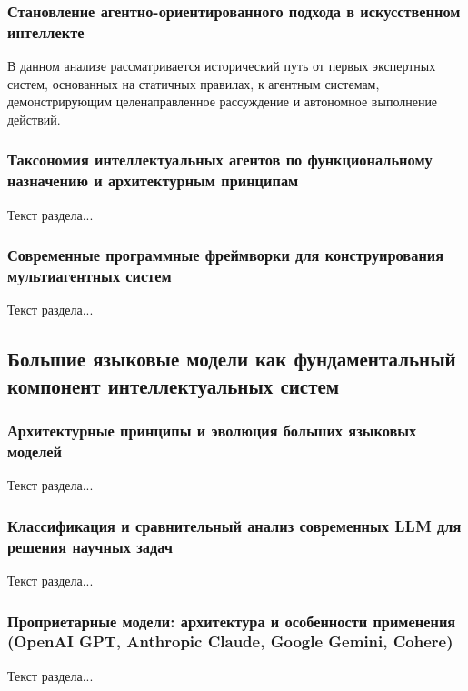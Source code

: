 \subsubsection{Становление агентно-ориентированного подхода в искусственном интеллекте}

В данном анализе рассматривается исторический путь от первых экспертных систем, основанных на статичных правилах, к агентным системам, демонстрирующим целенаправленное рассуждение и автономное выполнение действий.

\subsubsection{Таксономия интеллектуальных агентов по функциональному назначению и архитектурным принципам}

Текст раздела...

\subsubsection{Современные программные фреймворки для конструирования мультиагентных систем}

Текст раздела...

\subsection{Большие языковые модели как фундаментальный компонент интеллектуальных систем}

\subsubsection{Архитектурные принципы и эволюция больших языковых моделей}

Текст раздела...

\subsubsection{Классификация и сравнительный анализ современных LLM для решения научных задач}

Текст раздела...

\subsubsection{Проприетарные модели: архитектура и особенности применения (OpenAI GPT, Anthropic Claude, Google Gemini, Cohere)}

Текст раздела...

